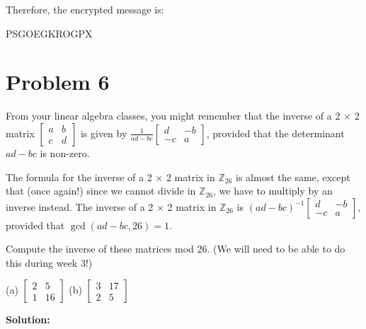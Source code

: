 \documentclass[12pt]{article}
\begin{document}
Therefore, the encrypted message is:

\begin{center}
PSGOEGKROGPX
\end{center}

\newpage
\section*{Problem 6}
From your linear algebra classes, you might remember that the inverse of a 2 × 2 matrix $\begin{bmatrix} a & b \\ c & d \end{bmatrix}$ is given by $\frac{1}{ad-bc}\begin{bmatrix} d & -b \\ -c & a \end{bmatrix}$, provided that the determinant $ad-bc$ is non-zero.

The formula for the inverse of a 2 × 2 matrix in $\mathbb{Z}_{26}$ is almost the same, except that (once again!) since we cannot divide in $\mathbb{Z}_{26}$, we have to multiply by an inverse instead. The inverse of a 2 × 2 matrix in $\mathbb{Z}_{26}$ is $(ad-bc)^{-1}\begin{bmatrix} d & -b \\ -c & a \end{bmatrix}$, provided that $\gcd(ad-bc,26) = 1$.

Compute the inverse of these matrices mod 26. (We will need to be able to do this during week 3!)

\begin{center}
(a) $\begin{bmatrix} 2 & 5 \\ 1 & 16 \end{bmatrix}$ \hspace{2cm} 
(b) $\begin{bmatrix} 3 & 17 \\ 2 & 5 \end{bmatrix}$
\end{center}

\vspace{1em}
\textbf{Solution:}
\end{document}
